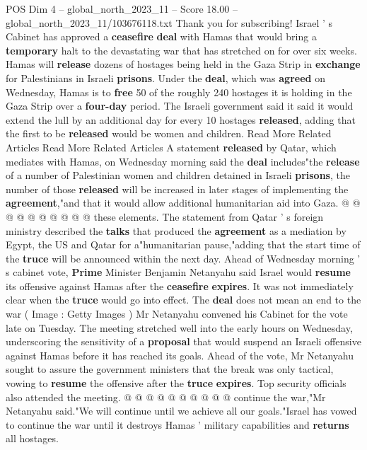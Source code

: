 \begin{textsample}{POS Dim 4 – global\_north\_2023\_11 – Score 18.00 – global\_north\_2023\_11/103676118.txt}  \label{ex:f4_pos_205}
Thank you for subscribing!
Israel ' s Cabinet has approved a \textbf{ceasefire} \textbf{deal} with Hamas that would bring a \textbf{temporary} halt to the devastating war that has stretched on for over six weeks.
Hamas will \textbf{release} dozens of hostages being held in the Gaza Strip in \textbf{exchange} for Palestinians in Israeli \textbf{prisons}.
Under the \textbf{deal}, which was \textbf{agreed} on Wednesday, Hamas is to \textbf{free} 50 of the roughly 240 hostages it is holding in the Gaza Strip over a \textbf{four-day} period.
The Israeli government said it said it would extend the lull by an additional day for every 10 hostages \textbf{released}, adding that the first to be \textbf{released} would be women and children.
Read More Related Articles Read More Related Articles A statement \textbf{released} by Qatar, which mediates with Hamas, on Wednesday morning said the \textbf{deal} includes"the \textbf{release} of a number of Palestinian women and children detained in Israeli \textbf{prisons}, the number of those \textbf{released} will be increased in later stages of implementing the \textbf{agreement},"and that it would allow additional humanitarian aid into Gaza. @ @ @ @ @ @ @ @ @ @ these elements.
The statement from Qatar ' s foreign ministry described the \textbf{talks} that produced the \textbf{agreement} as a mediation by Egypt, the US and Qatar for a"humanitarian pause,"adding that the start time of the \textbf{truce} will be announced within the next day.
Ahead of Wednesday morning ' s cabinet vote, \textbf{Prime} Minister Benjamin Netanyahu said Israel would \textbf{resume} its offensive against Hamas after the \textbf{ceasefire} \textbf{expires}.
It was not immediately clear when the \textbf{truce} would go into effect.
The \textbf{deal} does not mean an end to the war ( Image : Getty Images ) Mr Netanyahu convened his Cabinet for the vote late on Tuesday.
The meeting stretched well into the early hours on Wednesday, underscoring the sensitivity of a \textbf{proposal} that would suspend an Israeli offensive against Hamas before it has reached its goals.
Ahead of the vote, Mr Netanyahu sought to assure the government ministers that the break was only tactical, vowing to \textbf{resume} the offensive after the \textbf{truce} \textbf{expires}.
Top security officials also attended the meeting. @ @ @ @ @ @ @ @ @ @ continue the war,"Mr Netanyahu said."We will continue until we achieve all our goals."Israel has vowed to continue the war until it destroys Hamas ' military capabilities and \textbf{returns} all hostages.

\end{textsample}
